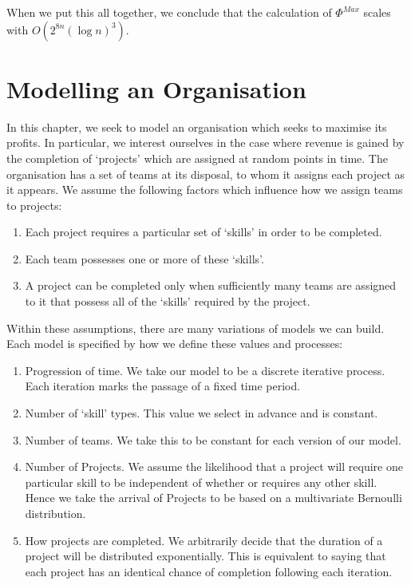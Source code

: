 When we put this all together, we conclude that the calculation of $\Phi^{Max}$ scales with $O( 2^{8n}(\log n)^3)$.


\section{Modelling an Organisation}

In this chapter, we seek to model an organisation which seeks to maximise its profits. In particular, we interest ourselves in the case where revenue is gained by the completion of `projects' which are assigned at random points in time. The organisation has a set of teams at its disposal, to whom it assigns each project as it appears. We assume the following factors which influence how we assign teams to projects:

\begin{enumerate}
	\item Each project requires a particular set of `skills' in order to be completed. 
	
	\item Each team possesses one or more of these `skills'. 
	
	\item A project can be completed only when sufficiently many teams are assigned to it that possess all of the `skills' required by the project.


\end{enumerate}

Within these assumptions, there are many variations of models we can build. Each model is specified by how we define these values and processes:

\begin{enumerate}
	\item Progression of time. We take our model to be a discrete iterative process. Each iteration marks the passage of a fixed time period. 

	\item Number of `skill' types. This value we select in advance and is constant.
	\item Number of teams. We take this to be constant for each version of our model.

	\item Number of Projects. We assume the likelihood that a project will require one particular skill to be independent of whether or requires any other skill. Hence we take the arrival of Projects to be based on a multivariate Bernoulli distribution. 
	
	\item How projects are completed. We arbitrarily decide that the duration of a project will be distributed exponentially. This is equivalent to saying that each project has an identical chance of completion following each iteration.
	

\end{enumerate}


